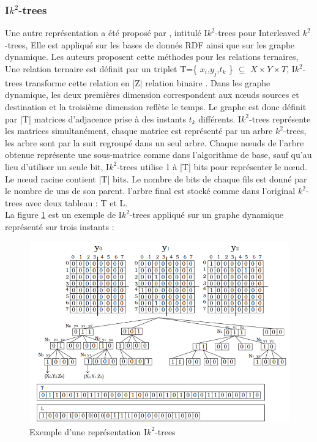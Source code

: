 \subsubsection{I$k^2$-trees}
Une autre représentation a été proposé par \citep{garcia2014interleaved}, intitulé I$k^2$-trees pour Interleaved $k^2$-trees, Elle est appliqué sur les bases de donnés RDF ainsi que sur les graphe dynamique. Les auteurs proposent cette méthodes pour les relations ternaires, Une relation ternaire est définit par un triplet T=\{ $x_i$,$y_j$,$t_k$ \} $\subseteq$ $ X \times Y \times T$, I$k^2$-trees transforme cette relation en |Z| relation binaire . Dans les graphe dynamique, les deux premières dimension correspondent aux nœuds sources et destination et la troisième dimension reflète le temps. Le graphe est donc définit par |T| matrices d'adjacence prise à des instants $t_k$ différents. I$k^2$-trees représente les matrices simultanément, chaque matrice est représenté par un arbre $k^2$-trees, les arbre sont par la suit regroupé dans un seul arbre. Chaque nœuds de l'arbre obtenue représente une sous-matrice comme dans l'algorithme de base, sauf qu'au lieu d'utiliser un seule bit, I$k^2$-trees utilise 1 à |T| bits pour représenter le nœud. Le nœud racine contient |T| bits. Le nombre de bits de chaque fils est donné par le nombre de uns de son parent. l'arbre final est stocké comme dans l'original $k^2$-trees avec deux tableau : T et L.\\
La figure \ref{Ik2-trees} est un exemple de I$k^2$-trees appliqué sur un graphe dynamique représenté sur trois instants \citep{garcia2014interleaved} :

\begin{figure}[H]
\begin{center}
\includegraphics[height=200 pt, width=380 pt]{./ressources/image/Ik2-trees.png} 
\end{center}
\caption{Exemple d'une représentation I$k^2$-trees}
\label{Ik2-trees}
\end{figure}

